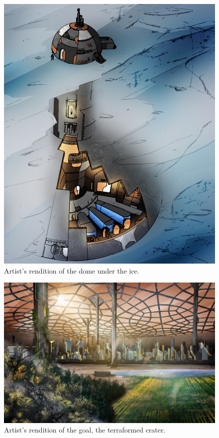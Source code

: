 \documentclass[fleqn,10pt]{Stylesheet} %
\begin{document}
\begin{figure}
    \centering
    \includegraphics[width=\linewidth]{art/dome_crop.jpg}
    \caption{Artist's rendition of the dome under the ice.}
    \label{fig:dome}
\end{figure}

\begin{figure}
    \centering
    \includegraphics[width=\linewidth]{art/terraformed_dome.jpg}
    \caption{Artist's rendition of the goal, the terraformed crater.}
    \label{fig:terraformed_dome}
\end{figure}
\end{document}
